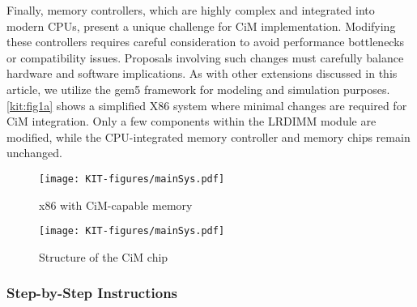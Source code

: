 Finally, memory controllers, which are highly complex and integrated into modern CPUs, present a unique challenge for CiM implementation. Modifying these controllers requires careful consideration to avoid performance bottlenecks or compatibility issues. Proposals involving such changes must carefully balance hardware and software implications.
As with other extensions discussed in this article, we utilize the gem5 framework \cite{kit/gem5-1,kit/gem5-2} for modeling and simulation purposes.
\cref{kit:fig1a} shows a simplified X86 system where minimal changes are required for CiM integration. Only a few components within the LRDIMM module are modified, while the CPU-integrated memory controller and memory chips remain unchanged.

\begin{figure}[ht]
	\centering
	\begin{minipage}[c]{0.4\textwidth}
		\centering
		\texttt{[image: KIT-figures/mainSys.pdf]} 
		\caption{x86 with CiM-capable memory}
		\label{kit:fig1a}
	\end{minipage}
	\hfill
	\begin{minipage}[c]{0.49\textwidth}
		\centering
		\texttt{[image: KIT-figures/mainSys.pdf]} 
		\caption{Structure of the CiM chip}
		\label{kit:fig1b}
	\end{minipage}
\end{figure}


\subsubsection{Step-by-Step Instructions}\label{kit/label1}

